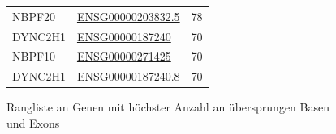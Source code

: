 \documentclass[12pt]{article}
\begin{document}
\begin{figure}[htbp]
\begin{minipage}{0.45\textwidth}
\begin{tabular}{l|l|l}
			NBPF20                   & \href{https://asia.ensembl.org/Homo_sapiens/Gene/Idhistory?g=ENSG00000203832}{ENSG00000203832.5}                                          & 78                      \\
			DYNC2H1                  & \href{https://asia.ensembl.org/Homo_sapiens/Gene/Summary?db=core;g=ENSG00000187240;r=11:103109410-103479863}{ENSG00000187240}             & 70                      \\
			NBPF10                   & \href{https://asia.ensembl.org/Homo_sapiens/Gene/Summary?db=core;g=ENSG00000271425;r=1:146064711-146229000}{ENSG00000271425}              & 70                      \\
			DYNC2H1                  & \href{https://asia.ensembl.org/Homo_sapiens/Gene/Summary?db=core;g=ENSG00000187240;r=11:103109410-103479863}{ENSG00000187240.8}           & 70                      \\
		\end{tabular}
	\end{minipage}
    \caption{Rangliste an Genen mit höchster Anzahl an übersprungen Basen und Exons}\label{tab:top}
\end{figure}












\printbibliography


\newpage~\appendix
\end{document}
